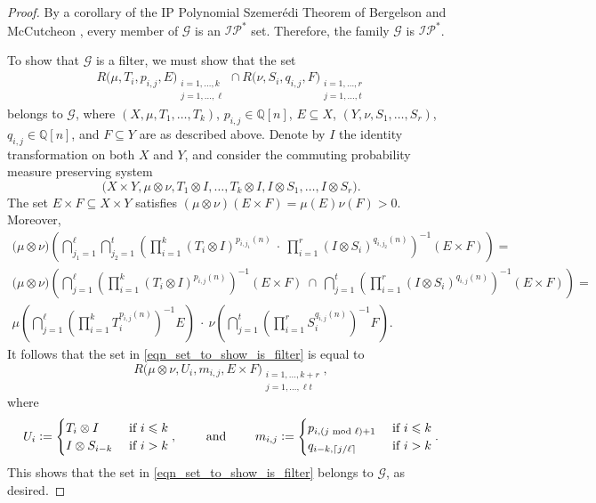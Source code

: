 \documentclass[letter,11pt]{article}
\theoremstyle{plain}
\theoremstyle{definition}
\theoremstyle{plain}
\theoremstyle{plain}
\numberwithin{equation}{section}
\newcommand{\Szemeredi}{Szemer\'{e}di}
\newcommand{\Q}{\mathbb{Q}}
\newcommand{\defeq}{\vcentcolon=}
\renewcommand{\leq}{\leqslant}
\newcommand{\IP}{\mathcal{IP}}
\newcommand{\filtertwo}{\mathscr{G}}
\newcommand{\polyret}{R}
\begin{document}
\begin{proof}
    By a corollary of the IP Polynomial \Szemeredi{} Theorem of Bergelson and McCutcheon \cite[Thm. 7.12]{Bergelson-McCutcheon-IPpolynomialSzemeredi}, every member of $\filtertwo$ is an $\IP^*$ set.  Therefore, the family $\filtertwo$ is $\IP^*$.

    
    To show that $\filtertwo$ is a filter, we must show that the set
    \begin{align}
        \label{eqn_set_to_show_is_filter}
        \polyret \big(\mu, T_i, p_{i,j}, E \big)_{\substack{i = 1, \ldots, k \\ j = 1, \ldots, \ell}} \cap \polyret \big(\nu, S_i, q_{i,j}, F \big)_{\substack{i = 1, \ldots, r \\ j = 1, \ldots, t}}
    \end{align}
    belongs to $\filtertwo$, where $(X, \mu, T_1, \ldots, T_k)$, $p_{i, j} \in \Q[n]$, $E \subseteq X$, $(Y, \nu, S_1, \ldots, S_r)$, $q_{i, j} \in \Q[n]$, and $F \subseteq Y$ are as described above.  Denote by $I$ the identity transformation on both $X$ and $Y$, and consider the commuting probability measure preserving system
    \[\big(X \times Y, \mu \otimes \nu, T_1 \otimes I, \ldots, T_k \otimes I, I \otimes S_1, \ldots, I \otimes S_r \big).\]
    The set $E \times F \subseteq X \times Y$ satisfies $(\mu \otimes \nu)(E \times F) = \mu(E) \nu(F) > 0$. Moreover,
    \begin{gather*}
        \big(\mu \otimes \nu \big) \left( \bigcap_{j_1=1}^{\ell} \bigcap_{j_2=1}^{t} \left( \prod_{i=1}^{k} (T_i \otimes I)^{p_{i,j_1}(n)} \ \cdot \ \prod_{i=1}^{r} (I \otimes S_i)^{q_{i,j_2}(n)}\right)^{-1} (E \times F) \right) = \\
        \big( \mu \otimes \nu \big) \left( \bigcap_{j=1}^{\ell} \left( \prod_{i=1}^{k} (T_i \otimes I)^{p_{i,j}(n)} \right)^{-1} (E \times F) \ \cap \ \bigcap_{j=1}^{t} \left( \prod_{i=1}^{r} (I \otimes S_i)^{q_{i,j}(n)} \right)^{-1} (E \times F) \right) = \\
        \mu\left( \bigcap_{j=1}^{\ell} \left( \prod_{i=1}^{k} T_i^{p_{i,j}(n)} \right)^{-1} E \right) \ \cdot \ \nu\left( \bigcap_{j=1}^{t} \left( \prod_{i=1}^{r} S_i^{q_{i,j}(n)} \right)^{-1} F \right).
    \end{gather*}
    It follows that the set in \eqref{eqn_set_to_show_is_filter} is equal to
    \[\polyret \big( \mu \otimes \nu, U_i, m_{i,j}, E \times F \big)_{\substack{i = 1, \ldots, k+r \\ j = 1, \ldots, \ell t}},\]
    where
    \[U_i \defeq \begin{cases} T_i \otimes I & \text{ if $i \leq k$} \\ I \otimes S_{i-k} & \text{ if $i > k$}\end{cases}, \qquad \text{ and } \qquad m_{i,j} \defeq \begin{cases} p_{i, (j \text{ mod } \ell) + 1} & \text{ if $i \leq k$} \\ q_{i-k, \lceil j / \ell \rceil} & \text{ if $i > k$}\end{cases}.\]
    This shows that the set in \eqref{eqn_set_to_show_is_filter} belongs to $\filtertwo$, as desired.
    

\end{proof}
\end{document}

